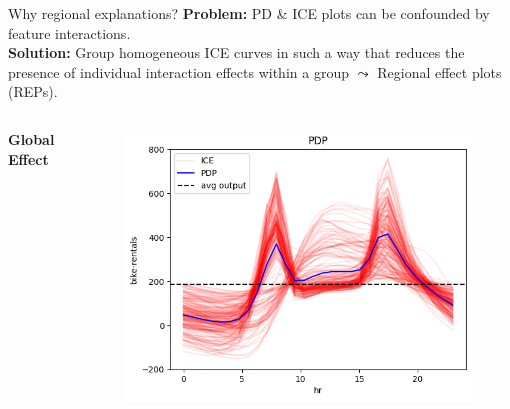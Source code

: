 \documentclass[11pt,compress,t,notes=noshow, aspectratio=169, xcolor=table,dvipsnames]{beamer}
\begin{document}
\begin{frame}{Why regional explanations?}
    \textbf{Problem:} PD \& ICE plots can be confounded by feature interactions.\\
    \textbf{Solution:} Group homogeneous ICE curves in such a way that reduces the presence of individual interaction effects within a group $\leadsto$ Regional effect plots (REPs).
  \noindent\makebox[\linewidth]{\rule{\textwidth}{0.4pt}}
  \begin{columns}
      \centering
      \textbf{Global Effect}
      \begin{figure}
          \centering
          \includegraphics[width=.9\linewidth]{figure/01_bike_sharing_dataset_18_1.png}
      \end{figure}


\end{columns}
\end{frame}
\end{document}
